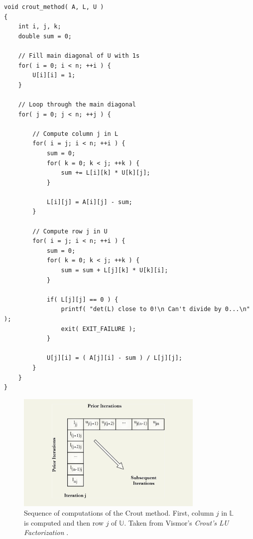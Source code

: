 \begin{lstlisting}[caption={C++ pseudocode implementing Crout's matrix decomposition algorithm. It assumes that \code{A[n][n]} is a two-dimensional array that represents the invertible square coefficient matrix $ \mathbb{A} $; \code{L[n][n]} and \code{U[n][n]} are also two-dimensional arrays reprenting matrices $ \mathbb{L} $ and $ \mathbb{U} $ respectively. Furthermore, it is assumed that \code{L} and \code{U} are populated with zeros. Derived from \emph{Crout's LU Factorization} \cite{rqjYYJkSwERYYbSy}, \emph{Numerical recipes: the art of scientific computing} \cite{Press2007} and \emph{Crout matrix decomposition} \cite{TgtpOw7zCHo3ii0m}.},label={Listing:theory-LU-decomposition-crout-method-pseudocode}]
void crout_method( A, L, U )
{
	int i, j, k;
	double sum = 0;
	
	// Fill main diagonal of U with 1s
	for( i = 0; i < n; ++i ) {
		U[i][i] = 1;
	}	

	// Loop through the main diagonal
	for( j = 0; j < n; ++j ) {
		
		// Compute column j in L
		for( i = j; i < n; ++i ) {
			sum = 0;
			for( k = 0; k < j; ++k ) {
				sum += L[i][k] * U[k][j];
			}

			L[i][j] = A[i][j] - sum;
		}
		
		// Compute row j in U
		for( i = j; i < n; ++i ) {
			sum = 0;
			for( k = 0; k < j; ++k ) {
				sum = sum + L[j][k] * U[k][i];
			}

			if( L[j][j] == 0 ) {
				printf( "det(L) close to 0!\n Can't divide by 0...\n" );
				exit( EXIT_FAILURE );
			}

			U[j][i] = ( A[j][i] - sum ) / L[j][j];
		}
	}
}
\end{lstlisting}

\begin{figure}[ht!]
	\centering
	\includegraphics[width=0.8\textwidth, keepaspectratio]{images/ch1/LU_decomposition_crout_method_visualization.png}
	\caption{Sequence of computations of the Crout method. First, column $ j $ in $ \mathbb{L} $ is computed and then row $ j $ of $ \mathbb{U} $. Taken from Vismor's \emph{Crout's LU Factorization} \cite{rqjYYJkSwERYYbSy}.}
	\label{Figure:theory-LU-decomposition-crout-method-visualisation}
\end{figure}

